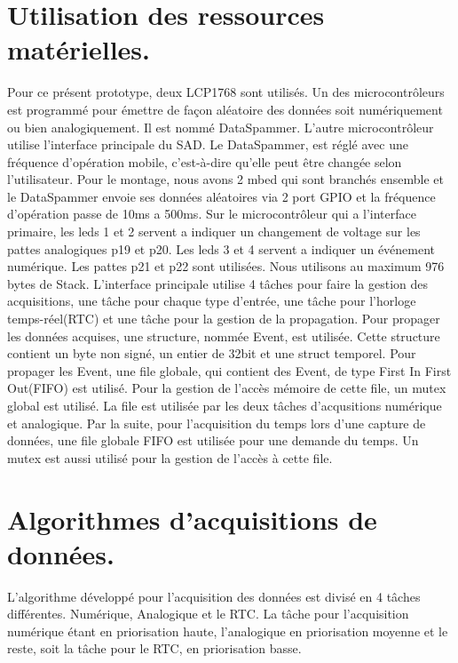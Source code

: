 \documentclass[12pt]{article}
\begin{document}
\section{Utilisation des ressources matérielles.}
Pour ce présent prototype, deux LCP1768 sont utilisés. Un des microcontrôleurs est programmé pour émettre de façon aléatoire des données soit numériquement ou bien analogiquement. Il est nommé DataSpammer. L'autre microcontrôleur utilise l'interface principale du SAD. Le DataSpammer, est réglé avec une fréquence d'opération mobile, c'est-à-dire qu'elle peut être changée selon l'utilisateur. Pour le montage, nous avons 2 mbed qui sont branchés ensemble et le DataSpammer envoie ses données aléatoires via 2 port GPIO et la fréquence d'opération passe de 10ms a 500ms. Sur le microcontrôleur qui a l'interface primaire, les leds 1 et 2 servent a indiquer un changement de voltage sur les pattes analogiques p19 et p20. Les leds 3 et 4 servent a indiquer un événement numérique. Les pattes p21 et p22 sont utilisées. Nous utilisons au maximum 976 bytes de Stack.
\newpage
L'interface principale utilise 4 tâches pour faire la gestion des acquisitions, une tâche pour chaque type d'entrée, une tâche pour l'horloge temps-réel(RTC) et une tâche pour la gestion de la propagation. Pour propager les données acquises, une structure, nommée Event, est utilisée. Cette structure contient un byte non signé, un entier de 32bit et une struct temporel. Pour propager les Event, une file globale, qui contient des Event, de type First In First Out(FIFO) est utilisé. Pour la gestion de l'accès mémoire de cette file, un mutex global est utilisé. La file est utilisée par les deux tâches d'acqusitions numérique et analogique. Par la suite, pour l'acquisition du temps lors d'une capture de données, une file globale FIFO est utilisée pour une demande du temps. Un mutex est aussi utilisé pour la gestion de l'accès à cette file.

\section{Algorithmes d'acquisitions de données.}
L'algorithme développé pour l'acquisition des données est divisé en 4 tâches différentes. Numérique, Analogique et le RTC. La tâche pour l'acquisition numérique étant en priorisation haute, l'analogique en priorisation moyenne et le reste, soit la tâche pour le RTC, en priorisation basse.
\end{document}
